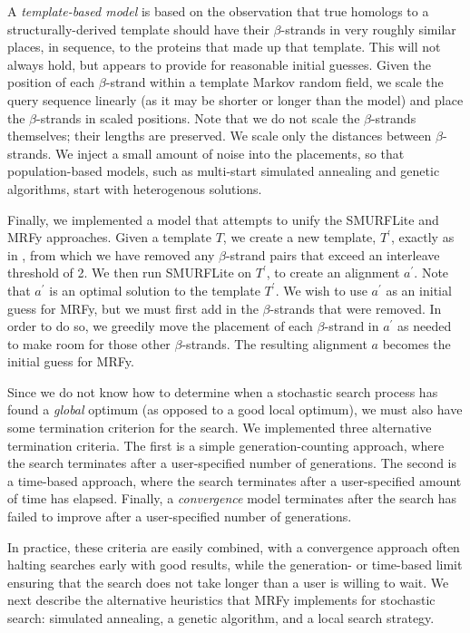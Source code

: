 \documentclass{acm_proc_article-sp}
\begin{document}
A \emph{template-based model} is based on the observation 
that true homologs
to a structurally-derived template should have their $\beta$-strands in very
roughly similar places, in sequence, to the proteins that made up that
template.
This will not always hold, but appears to provide for reasonable initial
guesses.
Given the position of each $\beta$-strand within a template Markov random 
field, we scale the query sequence linearly (as it may be shorter or longer 
than the model) and place the $\beta$-strands in scaled positions.
Note that we do not scale the $\beta$-strands themselves; their lengths are
preserved.
We scale only the distances between $\beta$-strands.
We inject a small amount of noise into the placements, so that 
population-based models, such as multi-start simulated annealing and genetic
algorithms, start with heterogenous solutions.
  
Finally, we implemented a model that attempts to unify the SMURFLite and
MRFy approaches.
Given a template $T$, we create a new template, $T^\prime$, exactly as in
\citet{Daniels:2012dg}, from which we have removed any $\beta$-strand pairs
that exceed an interleave threshold of 2.
We then run SMURFLite on $T^\prime$, to create an alignment $a^\prime$.
Note that $a^\prime$ is an optimal solution to the template $T^\prime$.
We wish to use $a^\prime$ as an initial guess for MRFy, but we must first add
in the $\beta$-strands that were removed.
In order to do so, we greedily move the placement of each $\beta$-strand in
$a^\prime$ as needed to make room for those other $\beta$-strands.
The resulting alignment $a$ becomes the initial guess for MRFy.


Since we do not know how to determine when a stochastic search process has found
a \emph{global} optimum (as opposed to a good local optimum), we must also have
some termination criterion for the search.
We implemented three alternative termination criteria. The first is a simple 
generation-counting approach, where the search terminates after
a user-specified number of generations.
The second is a time-based approach, where the search terminates after a 
user-specified amount of time has elapsed.
Finally, a \emph{convergence} model terminates after the search
has failed to improve after a user-specified number of generations.
  
In practice, these criteria are easily combined, with a convergence approach
often halting searches early with good results, while the generation- or 
time-based limit ensuring that the search does not take longer than a user is
willing to wait.
We next describe the alternative heuristics that MRFy implements for stochastic
search: simulated annealing, a genetic algorithm, and a local search strategy.
\end{document}
